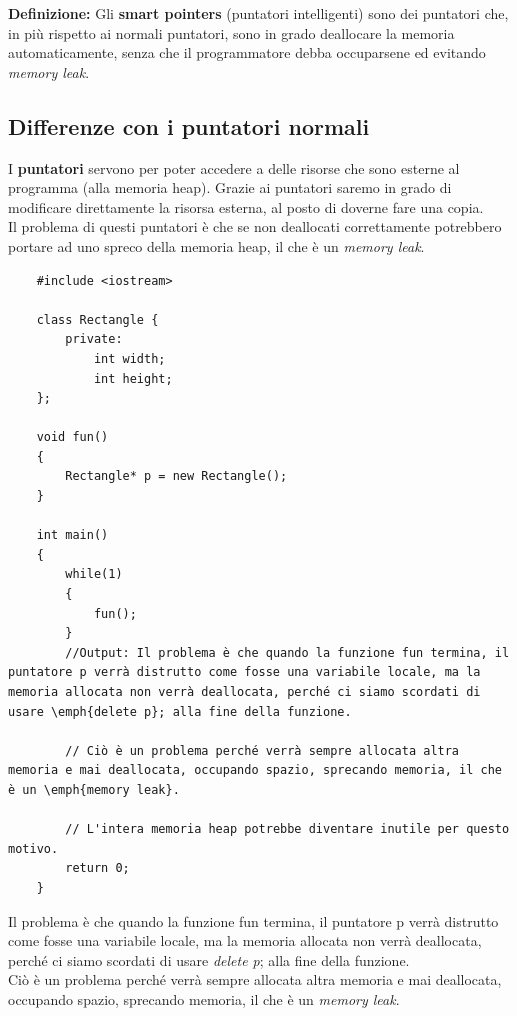 \textsf{\small \textbf{Definizione: } Gli \textbf{smart pointers} (puntatori intelligenti) sono dei puntatori che, in più rispetto ai normali puntatori, sono in grado deallocare la memoria automaticamente, senza che il programmatore debba occuparsene ed evitando \emph{memory leak}.} \\

\subsection{Differenze con i puntatori normali}

\textsf{\small I \textbf{puntatori} servono per poter accedere a delle risorse che sono esterne al programma (alla memoria heap). Grazie ai puntatori saremo in grado di modificare direttamente la risorsa esterna, al posto di doverne fare una copia.} \\

\textsf{\small Il problema di questi puntatori è che se non deallocati correttamente potrebbero portare ad uno spreco della memoria heap, il che è un \emph{memory leak}.} \\

\begin{lstlisting}
	#include <iostream>
	
	class Rectangle {
		private:
			int width;
			int height;
	};

	void fun()
	{
		Rectangle* p = new Rectangle();
	}

	int main()
	{
		while(1)
		{
			fun();
		}
		//Output: Il problema è che quando la funzione fun termina, il puntatore p verrà distrutto come fosse una variabile locale, ma la memoria allocata non verrà deallocata, perché ci siamo scordati di usare \emph{delete p}; alla fine della funzione.
		
		// Ciò è un problema perché verrà sempre allocata altra memoria e mai deallocata, occupando spazio, sprecando memoria, il che è un \emph{memory leak}.
		
		// L'intera memoria heap potrebbe diventare inutile per questo motivo. 
		return 0;
	}
\end{lstlisting}

\textsf{\small Il problema è che quando la funzione fun termina, il puntatore p verrà distrutto come fosse una variabile locale, ma la memoria allocata non verrà deallocata, perché ci siamo scordati di usare \emph{delete p}; alla fine della funzione.} \\

\textsf{\small Ciò è un problema perché verrà sempre allocata altra memoria e mai deallocata, occupando spazio, sprecando memoria, il che è un \emph{memory leak}.} \\

